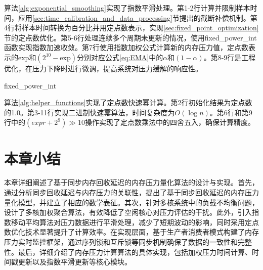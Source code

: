 算法\ref{alg:exponential_smoothing}实现了指数平滑处理。第1-2行计算并限制样本时间，应用\ref{sec:time_calibration_and_data_processing}节提出的截断补偿机制。第4行将样本时间转换为百分比并用定点数表示，实现\ref{sec:fixed_point_optimization}节的定点数优化。第5-6行处理连续多个周期未更新的情况，使用fixed\_power\_int函数实现指数加速收敛。第7行使用指数加权公式计算新的内存压力值，定点数表示的exp和$(2^{10}-\text{exp})$分别对应公式\ref{eq:EMA}中的\(\alpha\)和\((1-\alpha)\)。第8-9行是工程优化，在压力下降时进行微调，提高系统对压力缓解的响应性。
\begin{algorithm}[htbp]
    \caption{fixed\_power\_int}
    \label{alg:helper_functions}

\end{algorithm}
算法\ref{alg:helper_functions}实现了定点数快速幂计算。第2行初始化结果为定点数的1.0。第3-11行实现二进制快速幂算法，时间复杂度为$O(\log n)$。第6行和第9行中的$(expr + 2^9) \gg 10$操作实现了定点数乘法中的四舍五入，确保计算精度。




\section{本章小结}
本章详细阐述了基于同步内存回收延迟的内存压力量化算法的设计与实现。首先，通过分析同步回收延迟与内存压力的关联性，提出了基于同步回收延迟的内存压力量化模型，并建立了相应的数学表征。其次，针对多核系统中的负载不均衡问题，设计了多核加权聚合算法，有效降低了空闲核心对压力评估的干扰。此外，引入指数移动平均算法对压力数据进行平滑处理，减少了短期波动的影响，同时采用定点数优化技术显著提升了计算效率。在实现层面，基于生产者消费者模式构建了内存压力实时监控框架，通过序列锁和互斥锁等同步机制确保了数据的一致性和完整性。最后，详细介绍了内存压力计算算法的具体实现，包括加权压力时间计算、时间戳更新以及指数平滑更新等核心模块。